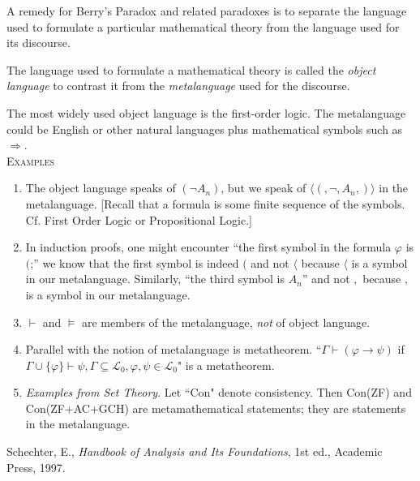 \documentclass[12pt]{article}
\begin{document}
A remedy for Berry's Paradox and related paradoxes is to
separate the language used to formulate a particular mathematical
theory from the language used for its discourse.

The language used to formulate a mathematical theory is called the
\emph{object language} to contrast it from the \emph{metalanguage}
used for the discourse.

The most widely used object language is the first-order logic. The
metalanguage could be English or other natural languages plus
mathematical symbols such as $\Rightarrow$. \\

\textsc{Examples}
\begin{enumerate}
    \item The object language speaks of $(\neg A_n)$, but we speak
    of $\langle (, \neg, A_n, ) \rangle$ in the metalanguage.
    [Recall that a formula is some finite sequence of the symbols.
    Cf. First Order Logic or Propositional Logic.]

    \item In induction proofs, one might encounter ``the first
    symbol in the formula $\varphi$ is $($;'' we know that the first
    symbol is indeed $($ and not $\langle$ because $\langle$ is a
    symbol in our metalanguage. Similarly, ``the third symbol is
    $A_n$'' and not $,$ because $,$ is a symbol in our metalanguage.

    \item $\vdash$ and $\models$ are members of the metalanguage,
    \emph{not} of object language.

    \item Parallel with the notion of metalanguage is metatheorem.
    ``$\Gamma\vdash(\varphi\rightarrow\psi)$ if
    $\Gamma\cup\{\varphi\}\vdash\psi, \Gamma\subseteq\mathcal{L}_0,
    \varphi, \psi\in\mathcal{L}_0$" is a metatheorem.

    \item \emph{Examples from Set Theory}. Let ``Con" denote
    consistency. Then Con(ZF) and Con(ZF+AC+GCH) are metamathematical
    statements; they are statements in the metalanguage.
\end{enumerate}

\begin{thebibliography}{1}
Schechter, E., \emph{Handbook of Analysis and Its Foundations}, 1st ed., Academic Press, 1997.
\end{thebibliography}

\end{document}
